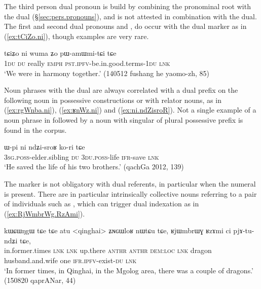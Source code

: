 The third person dual pronoun  is build by combining the pronominal root  with the dual  (§\ref{sec:pers.pronouns}), and is not attested in combination with the dual. The first and second dual pronouns  and , do occur with the dual marker as in (\ref{ex:tCiZo.ni}), though examples are very rare.

\begin{exe}
\ex \label{ex:tCiZo.ni}
\gll  tɕiʑo ni wuma ʑo pɯ-amɯmi-tɕi tɕe \\
\textsc{1du} \textsc{du} really \textsc{emph} \textsc{pst}.\textsc{ipfv}-be.in.good.terms-\textsc{1du} \textsc{lnk} \\
\glt `We were in harmony together.' (140512 fushang he yaomo-zh, 85)
\end{exe}

Noun phrases with the dual  are always correlated with a dual prefix on the following noun in possessive constructions or with relator nouns, as in (\ref{ex:rgWnba.ni}), (\ref{ex:ʁnWz.ni}) and (\ref{ex:ni.ndZisroR}). Not a single example of a noun phrase in  followed by a noun with singular of plural possessive prefix is found in the corpus.

\begin{exe}
\ex \label{ex:ni.ndZisroR} 
\gll ɯ-pi ni ndʑi-sroʁ ko-ri tɕe \\
\textsc{3sg}.\textsc{poss}-elder.sibling \textsc{du} \textsc{3du}.\textsc{poss}-life \textsc{ifr}-save \textsc{lnk} \\
\glt `He saved the life of his two brothers.' (qachGa 2012, 139)
\end{exe}

The marker  is not obligatory with dual referents, in particular when the numeral  is present. 
There are in particular intrinsically collective nouns referring to a pair of individuals  such as , which can trigger dual indexation as in (\ref{ex:RjWmbrWg.RzAmi}).

\begin{exe}
\ex \label{ex:RjWmbrWg.RzAmi}
\gll  kɯɕɯŋgɯ tɕe tɕe atu <qinghai> ʑɴɢɯloʁ nɯtɕu tɕe, ʁjɯmbrɯɣ ʁzɤmi ci pjɤ-tu-ndʑi tɕe,  \\
in.former.times \textsc{lnk}  \textsc{lnk} up.there  \textsc{anthr} \textsc{anthr} \textsc{dem}:\textsc{loc} \textsc{lnk} dragon husband.and.wife one \textsc{ifr}.\textsc{ipfv}-exist-\textsc{du} \textsc{lnk} \\
\glt `In former times, in Qinghai, in the Mgolog area, there was a couple of dragons.' (150820 qaprANar, 44)
\end{exe}

